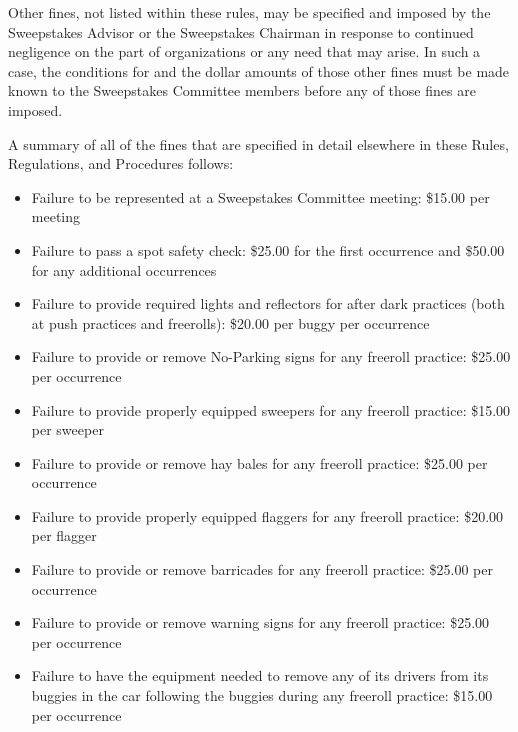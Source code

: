 	Other fines, not listed within these rules, may be specified and imposed by the
	Sweepstakes Advisor or the Sweepstakes Chairman in response to continued
	negligence on the part of organizations or any need that may arise. In such a
	case, the conditions for and the dollar amounts of those other fines must be
	made known to the Sweepstakes Committee members before any of those fines are
	imposed.

	A summary of all of the fines that are specified in detail elsewhere in these
	Rules, Regulations, and Procedures follows:

	\begin{itemize}

		\item Failure to be represented at a Sweepstakes Committee meeting: \$15.00
		per meeting

		\item Failure to pass a spot safety check: \$25.00 for the first occurrence
		and \$50.00 for any additional occurrences

		\item Failure to provide required lights and reflectors for after dark
		practices (both at push practices and freerolls): \$20.00 per buggy per
		occurrence

		\item Failure to provide or remove No-Parking signs for any freeroll
		practice: \$25.00 per occurrence

		\item Failure to provide properly equipped sweepers for any freeroll
		practice: \$15.00 per sweeper

		\item Failure to provide or remove hay bales for any freeroll practice:
		\$25.00 per occurrence

		\item Failure to provide properly equipped flaggers for any freeroll
		practice: \$20.00 per flagger

		\item Failure to provide or remove barricades for any freeroll practice:
		\$25.00 per occurrence

		\item Failure to provide or remove warning signs for any freeroll practice:
		\$25.00 per occurrence

		\item Failure to have the equipment needed to remove any of its drivers
		from its buggies in the car following the buggies during any freeroll practice:
		\$15.00 per occurrence


\end{itemize}
